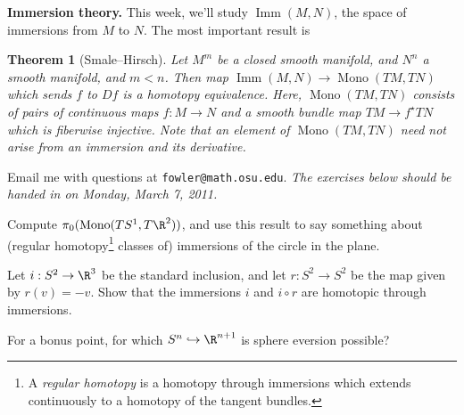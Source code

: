 \documentclass[12pt]{pset}
\author{Jim Fowler}
\date{Winter 2011}
\DeclareMathOperator{\Imm}{Imm}
\DeclareMathOperator{\Mono}{Mono}
\newtheorem*{theorem*}{Theorem}
\begin{document}
\maketitle

\noindent\textbf{Immersion theory.}  This week, we'll study
$\Imm(M,N)$, the space of immersions from $M$ to $N$.  The most
important result is

\begin{theorem*}[Smale--Hirsch]
  Let $M^m$ be a closed smooth manifold, and $N^n$ a smooth manifold,
  and $m < n$.
  Then map $\Imm(M,N) \to \Mono(TM,TN)$ which sends $f$ to $Df$ is a
  homotopy equivalence.  Here, $\Mono(TM,TN)$ consists of pairs of
  continuous maps $f : M \to N$ and a smooth bundle map $TM \to
  f^{\star}TN$ which is fiberwise injective.  Note that an element of
  $\Mono(TM,TN)$ need not arise from an immersion and its derivative.
\end{theorem*}

\noindent
Email me with questions at \texttt{fowler@math.osu.edu}.  \textit{The
  exercises below should be handed in on Monday, March 7, 2011.}

\begin{problem}

  Compute $\pi_0(\Mono(TS^1, T\R^2))$, and use this result to say
  something about (regular homotopy\footnote{A \textit{regular
      homotopy} is a homotopy through immersions which extends
    continuously to a homotopy of the tangent bundles.} classes of)
  immersions of the circle in the plane.

\end{problem}

\vfill

\begin{problem}

Let $i : S^2 \to \R^3$ be the standard inclusion, and let $r : S^2 \to
S^2$ be the map given by $r(v) = -v$.  Show that the immersions $i$
and $i \circ r$ are homotopic through immersions.

For a bonus point, for which $S^n \hookrightarrow \R^{n+1}$ is sphere
eversion possible?

\end{problem}

\vfill
\vfill
\vfill

\pagebreak

\null
\end{document}
